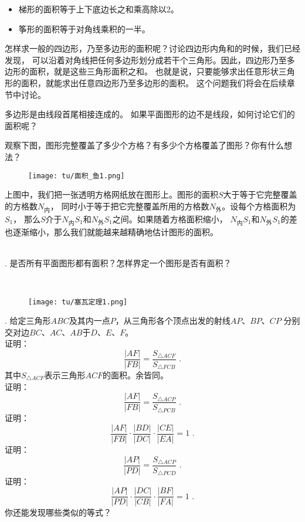 \documentclass[12pt,UTF8]{ctexbook}
\begin{document}
\begin{itemize}
    \item 梯形的面积等于上下底边长之和乘高除以2。
    \item 筝形的面积等于对角线乘积的一半。
\end{itemize}

怎样求一般的四边形，乃至多边形的面积呢？讨论四边形内角和的时候，我们已经发现，
可以沿着对角线把任何多边形划分成若干个三角形。因此，四边形乃至多边形的面积，就是这些三角形面积之和。
也就是说，只要能够求出任意形状三角形的面积，就能求出任意四边形乃至多边形的面积。
这个问题我们将会在后续章节中讨论。

多边形是由线段首尾相接连成的。
如果平面图形的边不是线段，如何讨论它们的面积呢？

观察下图，图形完整覆盖了多少个方格？有多少个方格覆盖了图形？你有什么想法？

\begin{figure}[H] 
    \vspace{4pt}
    \centering
    \texttt{[image: tu/面积\_鱼1.png]}
\end{figure}

上图中，我们把一张透明方格网纸放在图形上。图形的面积$S$大于等于它完整覆盖的方格数$N_{\text{内}}$，
同时小于等于把它完整覆盖所用的方格数$N_{\text{外}}$。设每个方格面积为$S_1$，
那么$S$介于$N_{\text{内}}S_1$和$N_{\text{外}}S_1$之间。如果随着方格面积缩小，
$N_{\text{内}}S_1$和$N_{\text{外}}S_1$的差也逐渐缩小，那么我们就能越来越精确地估计图形的面积。

\begin{sk}
    \mbox{} \\
    . 是否所有平面图形都有面积？怎样界定一个图形是否有面积？
\end{sk}

\begin{xt}
    \mbox{} \\

    \begin{figure}[H] 
        \vspace{4pt}
        \centering
        \texttt{[image: tu/塞瓦定理1.png]}
    \end{figure}

    . 给定三角形$ABC$及其内一点$P$，从三角形各个顶点出发的射线$AP$、$BP$、$CP$
    分别交对边$BC$、$AC$、$AB$于$D$、$E$、$F$。\\
     证明：
    $$ \frac{|AF|}{|FB|} = \frac{S_{\triangle ACF}}{S_{\triangle FCB}}\,\,.$$
    \indent 其中$S_{\triangle ACF}$表示三角形$ACF$的面积。余皆同。\\
     证明：
    $$ \frac{|AF|}{|FB|} = \frac{S_{\triangle ACP}}{S_{\triangle PCB}}\,\,.$$
     证明：
    $$ \frac{|AF|}{|FB|} \cdot \frac{|BD|}{|DC|} \cdot \frac{|CE|}{|EA|} = 1\,\,.$$
     证明：
    $$ \frac{|AP|}{|PD|} = \frac{S_{\triangle ACP}}{S_{\triangle PCD}}\,\,.$$
     证明：
    $$ \frac{|AP|}{|PD|} \cdot \frac{|DC|}{|CB|} \cdot \frac{|BF|}{|FA|} = 1\,\,.$$
     你还能发现哪些类似的等式？
\end{xt}
\end{document}

